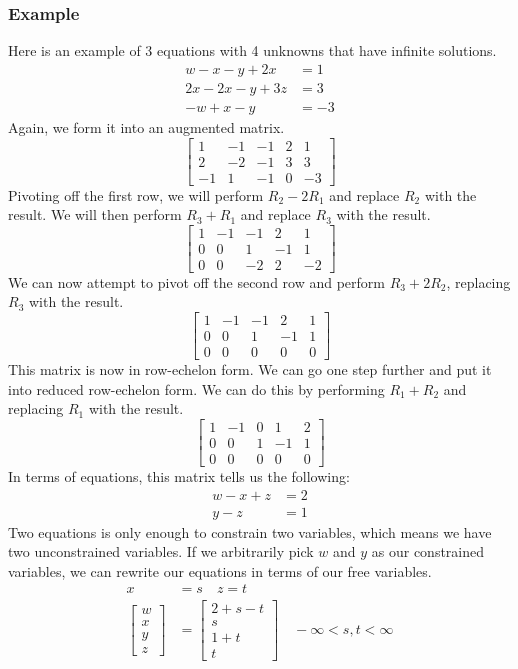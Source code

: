 \documentclass{math}
\begin{document}
\subsubsection*{Example}
Here is an example of 3 equations with 4 unknowns that have infinite solutions.
\begin{align*}
  w-x-y+2x &= 1 \\
  2x-2x-y+3z &= 3 \\
  -w+x-y &= -3
\end{align*}
Again, we form it into an augmented matrix.
\[ \begin{bmatrix}
  1 & -1 & -1 & 2 & 1 \\
  2 & -2 & -1 & 3 & 3 \\
  -1 & 1 & -1 & 0 & -3
\end{bmatrix} \]
Pivoting off the first row, we will perform \( R_2-2R_1 \) and replace \( R_2 \)
with the result. We will then perform \( R_3+R_1 \) and replace \( R_3 \) with
the result.
\[ \begin{bmatrix}
  1 & -1 & -1 & 2 & 1 \\
  0 & 0 & 1 & -1 & 1 \\
  0 & 0 & -2 & 2 & -2
\end{bmatrix} \]
We can now attempt to pivot off the second row and perform \( R_3+2R_2 \),
replacing \( R_3 \) with the result.
\[ \begin{bmatrix}
  1 & -1 & -1 & 2 & 1 \\
  0 & 0 & 1 & -1 & 1 \\
  0 & 0 & 0 & 0 & 0
\end{bmatrix} \]
This matrix is now in row-echelon form. We can go one step further and put it
into reduced row-echelon form. We can do this by performing \( R_1+R_2 \) and
replacing \( R_1 \) with the result.
\[ \begin{bmatrix}
  1 & -1 & 0 & 1 & 2 \\
  0 & 0 & 1 & -1 & 1 \\
  0 & 0 & 0 & 0 & 0
\end{bmatrix} \]
In terms of equations, this matrix tells us the following:
\begin{align*}
  w-x+z &= 2 \\
  y-z &= 1
\end{align*}
Two equations is only enough to constrain two variables, which means we have two
unconstrained variables. If we arbitrarily pick \( w \) and \( y \) as our
constrained variables, we can rewrite our equations in terms of our free
variables.
\begin{align*}
  x &= s \quad z = t \\
  \begin{bmatrix}w \\ x \\ y \\ z\end{bmatrix} &=
    \begin{bmatrix}
      2+s-t \\
      s \\
      1+t \\
      t
    \end{bmatrix} \quad -\infty<s,t<\infty \\
\end{align*}
\end{document}
